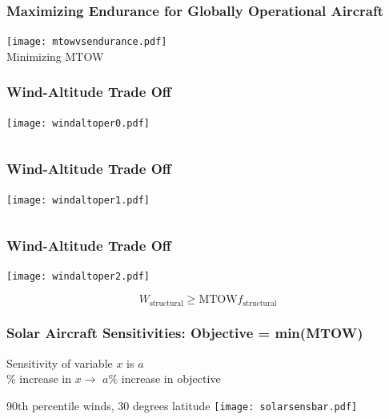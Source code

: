 \documentclass{beamer}
\begin{document}
\begin{frame}
    \frametitle{Maximizing Endurance for Globally Operational Aircraft}

    \pause
    \begin{center}
    \texttt{[image: mtowvsendurance.pdf]} \\
    Minimizing MTOW
    \end{center}

\end{frame}

\begin{frame}
    \frametitle{Wind-Altitude Trade Off}

    \begin{center}
    \texttt{[image: windaltoper0.pdf]} \\
    \end{center}
    
    \[ \]
\end{frame}

\begin{frame}
    \frametitle{Wind-Altitude Trade Off}

    \begin{center}
    \texttt{[image: windaltoper1.pdf]} \\
    \end{center}
    
    \[ \]

\end{frame}

\begin{frame}
    \frametitle{Wind-Altitude Trade Off}

    \begin{center}
    \texttt{[image: windaltoper2.pdf]} \\
    \end{center}
    
    \[ W_{\text{structural}} \geq \text{MTOW} f_{\text{structural}} \]

\end{frame}


\begin{frame}
    \frametitle{Solar Aircraft Sensitivities: Objective = min(MTOW)}

    \pause
    Sensitivity of variable $x$ is $a$ \\
    \% increase in $x \rightarrow$ $a\%$ increase in objective 
    \pause
    \begin{center}
        \scriptsize
        90th percentile winds, 30 degrees latitude
    \texttt{[image: solarsensbar.pdf]} 
    \end{center}

\end{frame}
\end{document}

